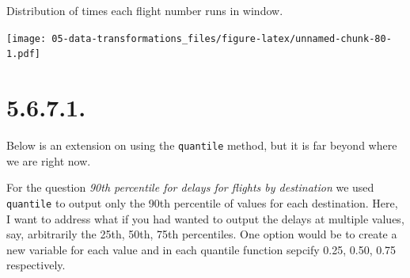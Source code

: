 \documentclass[]{book}
\newenvironment{Shaded}{\begin{snugshade}}{\end{snugshade}}
\newcommand{\DataTypeTok}[1]{\textcolor[rgb]{0.13,0.29,0.53}{#1}}
\newcommand{\DecValTok}[1]{\textcolor[rgb]{0.00,0.00,0.81}{#1}}
\newcommand{\FloatTok}[1]{\textcolor[rgb]{0.00,0.00,0.81}{#1}}
\newcommand{\KeywordTok}[1]{\textcolor[rgb]{0.13,0.29,0.53}{\textbf{#1}}}
\newcommand{\NormalTok}[1]{#1}
\newcommand{\OperatorTok}[1]{\textcolor[rgb]{0.81,0.36,0.00}{\textbf{#1}}}
\newcommand{\OtherTok}[1]{\textcolor[rgb]{0.56,0.35,0.01}{#1}}
\newcommand{\StringTok}[1]{\textcolor[rgb]{0.31,0.60,0.02}{#1}}
\theoremstyle{definition}
\theoremstyle{definition}
\theoremstyle{definition}
\theoremstyle{remark}
\begin{document}
Distribution of times each flight number runs in window.

\begin{Shaded}
\end{Shaded}

\texttt{[image: 05-data-transformations\_files/figure-latex/unnamed-chunk-80-1.pdf]}

\hypertarget{section-14}{%
\section{5.6.7.1.}\label{section-14}}

Below is an extension on using the \texttt{quantile} method, but it is
far beyond where we are right now.

For the question \emph{90th percentile for delays for flights by
destination} we used \texttt{quantile} to output only the 90th
percentile of values for each destination. Here, I want to address what
if you had wanted to output the delays at multiple values, say,
arbitrarily the 25th, 50th, 75th percentiles. One option would be to
create a new variable for each value and in each quantile function
sepcify 0.25, 0.50, 0.75 respectively.

\begin{Shaded}
\end{Shaded}
\end{document}
